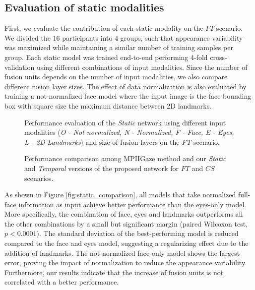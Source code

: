 \documentclass{bmvc2k}
\begin{document}
\subsection{Evaluation of static modalities}

First, we evaluate the contribution of each static modality on the $FT$ scenario. We divided the 16 participants into 4 groups, such that appearance variability was maximized while maintaining a similar number of training samples per group. Each static model was trained end-to-end performing 4-fold cross-validation using different combinations of input modalities. Since the number of fusion units depends on the number of input modalities, we also compare different fusion layer sizes. The effect of data normalization is also evaluated by training a not-normalized face model where the input image is the face bounding box with square size the maximum distance between 2D landmarks. 

\begin{figure}
	\begin{minipage}{.48\columnwidth}
		\centering
		\caption{Performance evaluation of the \textit{Static} network using different input modalities (\textit{O - Not normalized, N - Normalized, F - Face, E - Eyes, L - 3D Landmarks}) and size of fusion layers on the \textit{FT} scenario.}
		\label{fig:static_comparison}
	\end{minipage}
	\hspace{.03\columnwidth}
\begin{minipage}{.48\columnwidth}
		\centering
		\caption{Performance comparison among MPIIGaze method \cite{zhang2015appearance} and our \textit{Static} and \textit{Temporal} versions of the proposed network for $FT$ and $CS$ scenarios.}
		\label{fig:sota_comparison}
	\end{minipage}
\end{figure}

As shown in Figure \ref{fig:static_comparison}, all models that take normalized full-face information as input achieve better performance than the eyes-only model. More specifically, the combination of face, eyes and landmarks outperforms all the other combinations by a small but significant margin (paired Wilcoxon test, $p < 0.0001$). The standard deviation of the best-performing model is reduced compared to the face and eyes model, suggesting a regularizing effect due to the addition of landmarks. The not-normalized face-only model shows the largest error, proving the impact of normalization to reduce the appearance variability. Furthermore, our results indicate that the increase of fusion units is not correlated with a better performance. 
\end{document}
